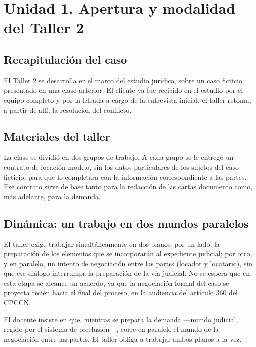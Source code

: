 \documentclass[12pt,oneside]{book}
\begin{document}
\section*{Unidad 1. Apertura y modalidad del Taller 2}

\subsection*{Recapitulación del caso}

El Taller 2 se desarrolla en el marco del estudio jurídico, sobre un caso ficticio presentado en una clase anterior. El cliente ya fue recibido en el estudio por el equipo completo y por la letrada a cargo de la entrevista inicial; el taller retoma, a partir de allí, la resolución del conflicto.

\subsection*{Materiales del taller}

La clase se dividió en dos grupos de trabajo. A cada grupo se le entregó un contrato de locación modelo, sin los datos particulares de los sujetos del caso ficticio, para que lo completara con la información correspondiente a las partes. Ese contrato sirve de base tanto para la redacción de las cartas documento como, más adelante, para la demanda.

\subsection*{Dinámica: un trabajo en dos mundos paralelos}

El taller exige trabajar simultáneamente en dos planos: por un lado, la preparación de los elementos que se incorporarán al expediente judicial; por otro, y en paralelo, un intento de negociación entre las partes (locador y locatario), sin que ese diálogo interrumpa la preparación de la vía judicial. No se espera que en esta etapa se alcance un acuerdo, ya que la negociación formal del caso se proyecta recién hacia el final del proceso, en la audiencia del artículo 360 del CPCCN.

\begin{important}
El docente insiste en que, mientras se prepara la demanda —mundo judicial, regido por el sistema de preclusión—, corre en paralelo el mundo de la negociación entre las partes. El taller obliga a trabajar ambos planos a la vez.
\end{important}
\end{document}
